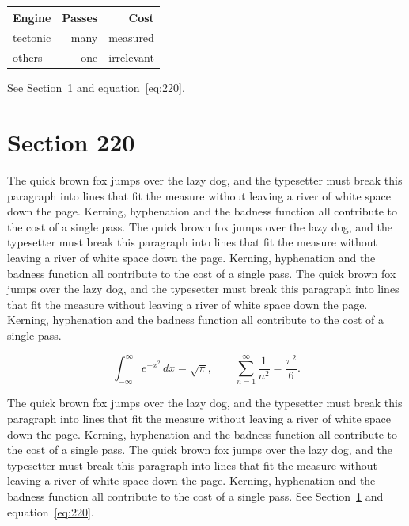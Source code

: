 \documentclass{article}
\begin{document}
\begin{center}
\begin{tabular}{lrr}
\toprule
Engine & Passes & Cost \\
\midrule
tectonic & many & measured \\
others & one & irrelevant \\
\bottomrule
\end{tabular}
\end{center}

See Section~\ref{sec:220} and equation~\eqref{eq:220}.
\section{Section 220}
\label{sec:220}
The quick brown fox jumps over the lazy dog, and the typesetter must break this paragraph into lines that fit the measure without leaving a river of white space down the page. Kerning, hyphenation and the badness function all contribute to the cost of a single pass. The quick brown fox jumps over the lazy dog, and the typesetter must break this paragraph into lines that fit the measure without leaving a river of white space down the page. Kerning, hyphenation and the badness function all contribute to the cost of a single pass. The quick brown fox jumps over the lazy dog, and the typesetter must break this paragraph into lines that fit the measure without leaving a river of white space down the page. Kerning, hyphenation and the badness function all contribute to the cost of a single pass. 

\begin{equation}\label{eq:220}
\int_{-\infty}^{\infty} e^{-x^{2}}\,dx = \sqrt{\pi}, \qquad
\sum_{n=1}^{\infty} \frac{1}{n^{2}} = \frac{\pi^{2}}{6}.
\end{equation}

The quick brown fox jumps over the lazy dog, and the typesetter must break this paragraph into lines that fit the measure without leaving a river of white space down the page. Kerning, hyphenation and the badness function all contribute to the cost of a single pass. The quick brown fox jumps over the lazy dog, and the typesetter must break this paragraph into lines that fit the measure without leaving a river of white space down the page. Kerning, hyphenation and the badness function all contribute to the cost of a single pass. 
See Section~\ref{sec:220} and equation~\eqref{eq:220}.
\end{document}
